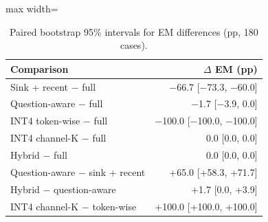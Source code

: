 \begin{table}[!htb]
\centering
\scriptsize
\setlength{\tabcolsep}{3.5pt}
\caption{Paired bootstrap 95\% intervals for EM differences (pp, 180 cases).}
\label{tab:t2cboot}
\begin{adjustbox}{max width=\linewidth}
\begin{tabular}{lr}
\toprule
Comparison & $\Delta$ EM (pp) \\
\midrule
Sink + recent $-$ full & $-$66.7 [$-$73.3, $-$60.0] \\
Question-aware $-$ full & $-$1.7 [$-$3.9, 0.0] \\
INT4 token-wise $-$ full & $-$100.0 [$-$100.0, $-$100.0] \\
INT4 channel-K $-$ full & 0.0 [0.0, 0.0] \\
Hybrid $-$ full & 0.0 [0.0, 0.0] \\
Question-aware $-$ sink + recent & +65.0 [+58.3, +71.7] \\
Hybrid $-$ question-aware & +1.7 [0.0, +3.9] \\
INT4 channel-K $-$ token-wise & +100.0 [+100.0, +100.0] \\
\bottomrule
\end{tabular}
\end{adjustbox}
\end{table}
